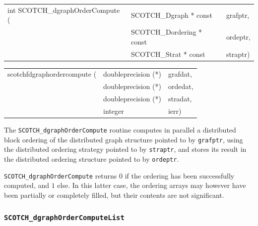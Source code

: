 \begin{itemize}
\progsyn

{\tt\begin{tabular}{l@{}ll}
int SCOTCH\_dgraphOrderCompute ( & SCOTCH\_Dgraph * const    & grafptr, \\
                                 & SCOTCH\_Dordering * const & ordeptr, \\
                                 & SCOTCH\_Strat * const     & straptr)
\end{tabular}}

{\tt\begin{tabular}{l@{}ll}
scotchfdgraphordercompute ( & doubleprecision (*) & grafdat, \\
                            & doubleprecision (*) & ordedat, \\
                            & doubleprecision (*) & stradat, \\
                            & integer             & ierr)
\end{tabular}}

\progdes

The {\tt SCOTCH\_dgraphOrderCompute} routine computes in parallel a
distributed block ordering of the distributed graph structure pointed
to by {\tt grafptr}, using the distributed ordering strategy pointed to
by {\tt straptr}, and stores its result in the distributed ordering
structure pointed to by {\tt ordeptr}.

\progret

{\tt SCOTCH\_dgraphOrderCompute} returns $0$ if the ordering has been
successfully computed, and $1$ else. In this latter case, the ordering
arrays may however have been partially or completely filled, but their
contents are not significant.
\end{itemize}

\subsubsection{{\tt SCOTCH\_dgraphOrderComputeList}}
\label{sec-lib-func-dgraphordercomputelist}

